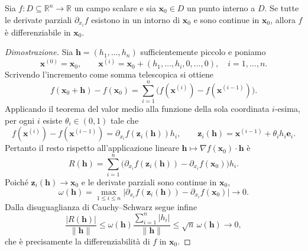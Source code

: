            \begin{theorem} 
                Sia $f: D \subseteq \mathbb{R}^{n} \rightarrow \mathbb{R}$ un
                campo scalare e sia $\mathbf{x}_0 \in D$ un punto interno a
                $D$. Se tutte le derivate parziali $\partial_{x_i}f$ esistono
                in un intorno di $\mathbf{x}_0$ e sono continue in
                $\mathbf{x}_0$, allora $f$ è differenziabile in
                $\mathbf{x}_0$.
            \end{theorem}

            \begin{proof} [Dimostrazione]
                Sia $\mathbf{h}=(h_1,\ldots,h_n)$ sufficientemente piccolo e
                poniamo
                \[
                    \mathbf{x}^{(0)}=\mathbf{x}_0, \qquad
                    \mathbf{x}^{(i)}
                    =\mathbf{x}_0+(h_1,\ldots,h_i,0,\ldots,0),
                    \quad i=1,\ldots,n.
                \]
                Scrivendo l'incremento come somma telescopica si ottiene
                \[
                    f(\mathbf{x}_0+\mathbf{h})-f(\mathbf{x}_0)
                    =\sum_{i=1}^n
                    \bigl(f(\mathbf{x}^{(i)})
                    -f(\mathbf{x}^{(i-1)})\bigr).
                \]
                Applicando il teorema del valor medio alla funzione della
                sola coordinata $i$-esima, per ogni $i$ esiste
                $\theta_i\in(0,1)$ tale che
                \[
                    f(\mathbf{x}^{(i)})-f(\mathbf{x}^{(i-1)})
                    =\partial_{x_i}f(\mathbf{z}_i(\mathbf{h}))h_i,
                    \qquad
                    \mathbf{z}_i(\mathbf{h})
                    =\mathbf{x}^{(i-1)}+\theta_i h_i\mathbf{e}_i.
                \]
                Pertanto il resto rispetto all'applicazione lineare
                $\mathbf{h}\mapsto\nabla f(\mathbf{x}_0)\cdot\mathbf{h}$ è
                \[
                    R(\mathbf{h})
                    =\sum_{i=1}^n
                    \bigl(\partial_{x_i}f(\mathbf{z}_i(\mathbf{h}))
                    -\partial_{x_i}f(\mathbf{x}_0)\bigr)h_i.
                \]
                Poiché $\mathbf{z}_i(\mathbf{h})\rightarrow\mathbf{x}_0$ e
                le derivate parziali sono continue in $\mathbf{x}_0$,
                \[
                    \omega(\mathbf{h})
                    =\max_{1\leq i\leq n}
                    \lvert\partial_{x_i}f(\mathbf{z}_i(\mathbf{h}))
                    -\partial_{x_i}f(\mathbf{x}_0)\rvert
                    \longrightarrow0.
                \]
                Dalla disuguaglianza di Cauchy--Schwarz segue infine
                \[
                    \frac{\lvert R(\mathbf{h})\rvert}
                    {\lVert\mathbf{h}\rVert}
                    \leq\omega(\mathbf{h})
                    \frac{\sum_{i=1}^n\lvert h_i\rvert}
                    {\lVert\mathbf{h}\rVert}
                    \leq\sqrt{n}\,\omega(\mathbf{h})\longrightarrow0,
                \]
                che è precisamente la differenziabilità di $f$ in
                $\mathbf{x}_0$.
            \end{proof}

